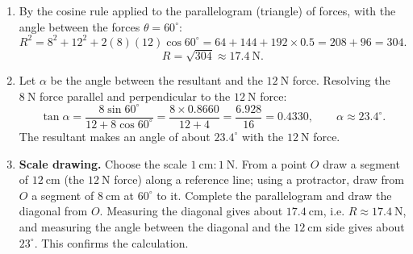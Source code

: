 \documentclass[11pt]{article}
\begin{document}
\begin{corrige}
\begin{enumerate}
\item By the cosine rule applied to the parallelogram (triangle) of forces, with the angle between the forces $\theta=60^{\circ}$:
\[
R^{2}=8^{2}+12^{2}+2(8)(12)\cos 60^{\circ}=64+144+192\times 0.5=208+96=304.
\]
\[
R=\sqrt{304}\approx 17.4\ \mathrm{N}.
\]
\item Let $\alpha$ be the angle between the resultant and the $12\ \mathrm{N}$ force. Resolving the $8\ \mathrm{N}$ force parallel and perpendicular to the $12\ \mathrm{N}$ force:
\[
\tan\alpha=\frac{8\sin 60^{\circ}}{12+8\cos 60^{\circ}}=\frac{8\times 0.8660}{12+4}=\frac{6.928}{16}=0.4330,
\qquad \alpha\approx 23.4^{\circ}.
\]
The resultant makes an angle of about $23.4^{\circ}$ with the $12\ \mathrm{N}$ force.
\item \textbf{Scale drawing.} Choose the scale $1\ \mathrm{cm}:1\ \mathrm{N}$. From a point $O$ draw a segment of $12\ \mathrm{cm}$ (the $12\ \mathrm{N}$ force) along a reference line; using a protractor, draw from $O$ a segment of $8\ \mathrm{cm}$ at $60^{\circ}$ to it. Complete the parallelogram and draw the diagonal from $O$. Measuring the diagonal gives about $17.4\ \mathrm{cm}$, i.e. $R\approx 17.4\ \mathrm{N}$, and measuring the angle between the diagonal and the $12\ \mathrm{cm}$ side gives about $23^{\circ}$. This confirms the calculation.
\end{enumerate}
\end{corrige}
\end{document}
